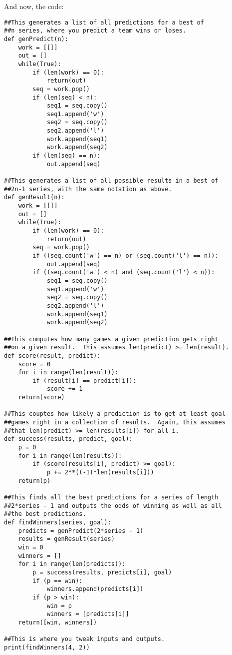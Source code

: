 \documentclass[11pt]{article}
\theoremstyle{definition}
\begin{document}
And now, the code:
\begin{verbatim}
##This generates a list of all predictions for a best of
##n series, where you predict a team wins or loses.
def genPredict(n):
    work = [[]]
    out = []
    while(True):
        if (len(work) == 0):
            return(out)
        seq = work.pop()
        if (len(seq) < n):
            seq1 = seq.copy()
            seq1.append('w')
            seq2 = seq.copy()
            seq2.append('l')
            work.append(seq1)
            work.append(seq2)
        if (len(seq) == n):
            out.append(seq)

##This generates a list of all possible results in a best of
##2n-1 series, with the same notation as above.
def genResult(n):
    work = [[]]
    out = []
    while(True):
        if (len(work) == 0):
            return(out)
        seq = work.pop()
        if ((seq.count('w') == n) or (seq.count('l') == n)):
            out.append(seq)
        if ((seq.count('w') < n) and (seq.count('l') < n)):
            seq1 = seq.copy()
            seq1.append('w')
            seq2 = seq.copy()
            seq2.append('l')
            work.append(seq1)
            work.append(seq2)

##This computes how many games a given prediction gets right
##on a given result.  This assumes len(predict) >= len(result).
def score(result, predict):
    score = 0
    for i in range(len(result)):
        if (result[i] == predict[i]):
            score += 1
    return(score)

##This couptes how likely a prediction is to get at least goal
##games right in a collection of results.  Again, this assumes
##that len(predict) >= len(results[i]) for all i.
def success(results, predict, goal):
    p = 0
    for i in range(len(results)):
        if (score(results[i], predict) >= goal):
            p += 2**((-1)*len(results[i]))
    return(p)

##This finds all the best predictions for a series of length
##2*series - 1 and outputs the odds of winning as well as all
##the best predictions.
def findWinners(series, goal):
    predicts = genPredict(2*series - 1)
    results = genResult(series)
    win = 0
    winners = []
    for i in range(len(predicts)):
        p = success(results, predicts[i], goal)
        if (p == win):
            winners.append(predicts[i])
        if (p > win):
            win = p
            winners = [predicts[i]]
    return([win, winners])

##This is where you tweak inputs and outputs.
print(findWinners(4, 2))
\end{verbatim}
\end{document}
